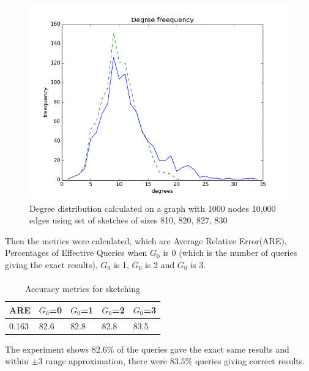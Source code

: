 \documentclass[12pt]{report}
\numberwithin{figure}{section}
\numberwithin{table}{section}
\begin{document}
\begin{figure}[H]
\centering
\includegraphics[scale=0.6]{images/n1000-e10000-sketches-810-820-823-827-830plot}
\caption[1000 nodes 10,000 edges with sketches of sizes 810, 820, 827, 830]{Degree distribution calculated on a graph with 1000 nodes 10,000 edges using set of sketches of sizes 810, 820, 827, 830}
\end{figure}

Then the metrics were calculated, which are Average Relative Error(ARE), Percentages of Effective Queries when $G_0$ is 0 (which is the number of queries giving the exact results), $G_0$ is 1, $G_0$ is 2 and $G_0$ is 3.

\paragraph{}

\begin{table}[H]
\centering
\begin{tabular}{|l|l|l|l|l|}
\hline
 ARE   & $G_0$=0 & $G_0$=1 & $G_0$=2 & $G_0$=3 \\ \hline
0.163 &   82.6  &   82.8  &   82.8  &   83.5  \\ \hline
\end{tabular}
\caption{Accuracy metrics for sketching}
\label{table:accuracy-metrics-for-sketching}
\end{table}


The experiment shows $82.6\%$ of the queries gave the exact same results and within $\pm3$ range approximation, there were $83.5\%$ queries giving correct results.
\end{document}
